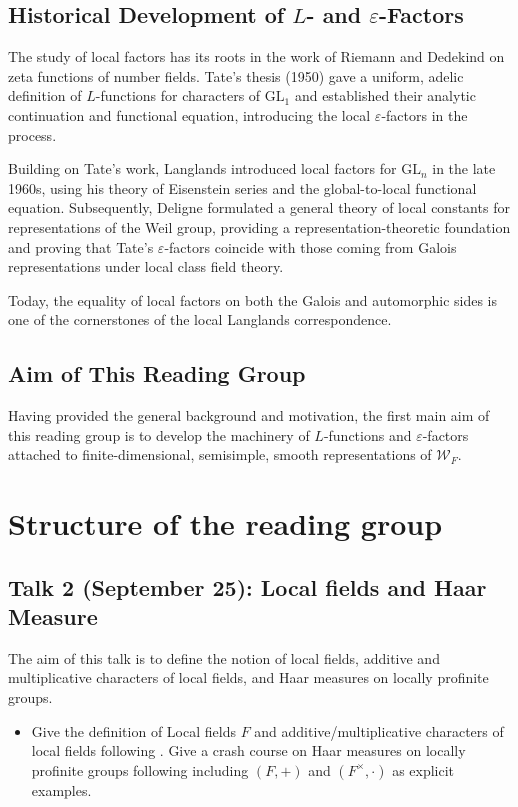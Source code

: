 \documentclass[11pt]{amsart}
\begin{document}
 
\bigskip

\subsection{Historical Development of $L$- and $\varepsilon$-Factors}

The study of local factors has its roots in the work of Riemann and 
Dedekind on zeta functions of number fields. 
Tate's thesis (1950) gave a uniform, adelic definition of $L$-functions 
for characters of $\mathrm{GL}_1$ and established their analytic continuation 
and functional equation, introducing the local $\varepsilon$-factors in the process.

Building on Tate’s work, Langlands introduced local factors for 
$\mathrm{GL}_n$ in the late 1960s, using his theory of Eisenstein series 
and the global-to-local functional equation. 
Subsequently, Deligne formulated a general theory of local constants 
for representations of the Weil group, providing a representation-theoretic 
foundation and proving that Tate’s $\varepsilon$-factors coincide with those 
coming from Galois representations under local class field theory.

Today, the equality of local factors on both the Galois and automorphic sides 
is one of the cornerstones of the local Langlands correspondence.



\bigskip


\subsection{Aim of This Reading Group}

Having provided the general background and motivation, 
the first main aim of this reading group is to develop the 
machinery of $L$-functions and $\varepsilon$-factors attached to 
finite-dimensional, semisimple, smooth representations of 
\(\mathcal{W}_F\).

\section{Structure of the reading group}
\subsection{Talk 2 (September 25): Local fields and Haar Measure}
The aim of this talk is to define the notion of local fields, additive and multiplicative characters of local fields, and Haar measures on locally profinite groups.
\begin{itemize}
    \item Give the definition of Local fields $F$ and additive/multiplicative characters of local fields following \cite[\S 1.1 - 1.4, \S 1.6-1.8]{BH06}. Give a crash course on Haar measures on locally profinite groups following \cite[\S 3.1-3.4]{BH06} including $(F,+)$ and $(F^\times,\cdot)$ as explicit examples. 
\end{itemize}
\end{document}
